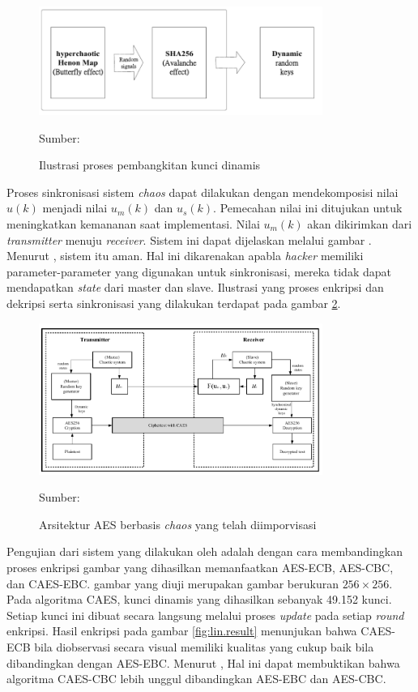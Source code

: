 \begin{figure}[!h]
  \centering
  \includegraphics[width=350px]{chapters/res/chapter-2/img/lin.keygen.png}
  \caption{Ilustrasi proses pembangkitan kunci dinamis} \label{fig:lin.keygen}
  Sumber: \textcite{lin2021}
\end{figure}

Proses sinkronisasi sistem \emph{chaos} dapat dilakukan dengan mendekomposisi nilai $u(k)$ menjadi nilai $u_m(k)$ dan $u_s(k)$. Pemecahan nilai ini ditujukan untuk meningkatkan kemananan saat implementasi. Nilai $u_m(k)$ akan dikirimkan dari \emph{transmitter} menuju \emph{receiver}. Sistem ini dapat dijelaskan melalui gambar . Menurut \textcite{lin2021}, sistem itu aman. Hal ini dikarenakan apabla \emph{hacker} memiliki parameter-parameter yang digunakan untuk sinkronisasi, mereka tidak dapat mendapatkan \emph{state} dari master dan slave. Ilustrasi yang proses enkripsi dan dekripsi serta sinkronisasi yang dilakukan terdapat pada gambar \ref{fig:lin.caes}.

\begin{figure}[!h]
  \centering
  \includegraphics[width=350px]{chapters/res/chapter-2/img/lin.caes.png}
  \caption{Arsitektur AES berbasis \emph{chaos} yang telah diimporvisasi} \label{fig:lin.caes}
  Sumber: \textcite{lin2021}
\end{figure}

Pengujian dari sistem yang dilakukan oleh \textcite{lin2021} adalah dengan cara membandingkan proses enkripsi gambar yang dihasilkan memanfaatkan AES-ECB, AES-CBC, dan CAES-EBC. gambar yang diuji merupakan gambar berukuran $256 \times 256$. Pada algoritma CAES, kunci dinamis yang dihasilkan sebanyak 49.152 kunci. Setiap kunci ini dibuat secara langsung melalui proses \emph{update} pada setiap \emph{round} enkripsi. Hasil enkripsi pada gambar \ref{fig:lin.result} menunjukan bahwa CAES-ECB bila diobservasi secara visual memiliki kualitas yang cukup baik bila dibandingkan dengan AES-EBC. Menurut \textcite{lin2021}, Hal ini dapat membuktikan bahwa algoritma CAES-CBC lebih unggul dibandingkan AES-EBC dan AES-CBC.

